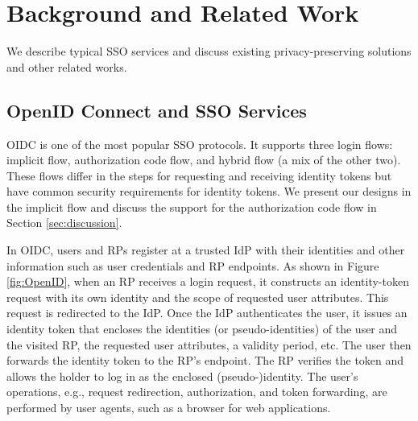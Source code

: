 \section{Background and Related Work}
\label{sec:background}

We describe %
typical SSO services and discuss existing privacy-preserving solutions and other related works.

\subsection{OpenID Connect and SSO Services}
\label{subsec:OIDC}
OIDC is one of the most popular SSO protocols. It supports three login flows: implicit flow, authorization code flow, and hybrid flow (a mix of the other two). These flows differ in the steps for requesting and receiving identity tokens but have common security requirements for identity tokens. We present our designs in the implicit flow and discuss the support for the authorization code flow in Section \ref{sec:discussion}.

In OIDC, users and RPs register at a trusted IdP with their identities
and other information such as user credentials %
and RP endpoints. %
As shown in Figure \ref{fig:OpenID}, when an RP receives a login request, it constructs an identity-token request with its own identity and the scope of requested user attributes.
This request is redirected to the IdP. Once the IdP authenticates the user, it issues an identity token that encloses the identities (or pseudo-identities) of the user and the visited RP, the requested user attributes, a validity period, etc. The user then forwards the identity token to the RP's endpoint. The RP verifies the token and allows the holder to log in as the enclosed (pseudo-)identity. The user's operations, e.g., request redirection, authorization, and token forwarding, are performed by user agents, such as a browser for web applications.


